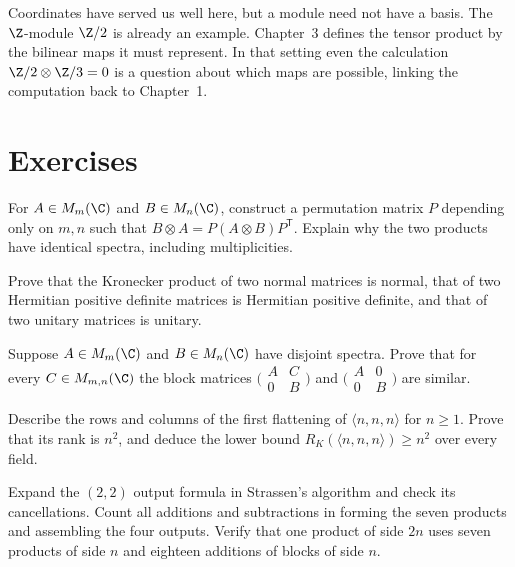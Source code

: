 Coordinates have served us well here, but a module need not have a basis. The $\Z$-module $\Z/2$ is already an example. Chapter~3 defines the tensor product by the bilinear maps it must represent. In that setting even the calculation $\Z/2\otimes\Z/3=0$ is a question about which maps are possible, linking the computation back to Chapter~1.

\section{Exercises}

\begin{exercise}[$\star$]\label{linear:ex:kroncommute}
For $A\in M_m(\C)$ and $B\in M_n(\C)$, construct a permutation matrix $P$ depending only on $m,n$ such that $B\otimes A=P(A\otimes B)P^{\mathsf T}$. Explain why the two products have identical spectra, including multiplicities.
\end{exercise}

\begin{exercise}[$\star$]\label{linear:ex:kronnormal}
Prove that the Kronecker product of two normal matrices is normal, that of two Hermitian positive definite matrices is Hermitian positive definite, and that of two unitary matrices is unitary.
\end{exercise}

\begin{exercise}[$\star\star$]\label{linear:ex:roth}
Suppose $A\in M_m(\C)$ and $B\in M_n(\C)$ have disjoint spectra. Prove that for every $C\in M_{m,n}(\C)$ the block matrices
$\bigl(\begin{smallmatrix}A&C\\0&B\end{smallmatrix}\bigr)$ and
$\bigl(\begin{smallmatrix}A&0\\0&B\end{smallmatrix}\bigr)$ are similar.
\end{exercise}

\begin{exercise}[$\star$]\label{linear:ex:flattening}
Describe the rows and columns of the first flattening of $\langle n,n,n\rangle$ for $n\ge1$. Prove that its rank is $n^2$, and deduce the lower bound $R_K(\langle n,n,n\rangle)\ge n^2$ over every field.
\end{exercise}

\begin{exercise}[$\star$]\label{linear:ex:strassen22}
Expand the $(2,2)$ output formula in Strassen's algorithm and check its cancellations. Count all additions and subtractions in forming the seven products and assembling the four outputs. Verify that one product of side $2n$ uses seven products of side $n$ and eighteen additions of blocks of side $n$.
\end{exercise}

